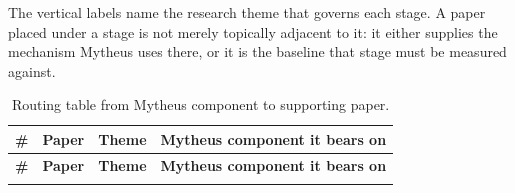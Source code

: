 The vertical labels name the research theme that governs each stage. A paper
placed under a stage is not merely topically adjacent to it: it either
supplies the mechanism Mytheus uses there, or it is the baseline that stage
must be measured against.

{\footnotesize
\begin{longtable}{@{}p{0.5cm}p{6.6cm}p{2.6cm}p{5.4cm}@{}}
\caption{Routing table from Mytheus component to supporting paper.}
\label{tab:map}\\
\toprule
\textbf{\#} & \textbf{Paper} & \textbf{Theme} & \textbf{Mytheus component it bears on} \\
\midrule
\endfirsthead
\toprule
\textbf{\#} & \textbf{Paper} & \textbf{Theme} & \textbf{Mytheus component it bears on} \\
\midrule
\endhead
\bottomrule
\endfoot

\end{longtable}
}

\newpage
